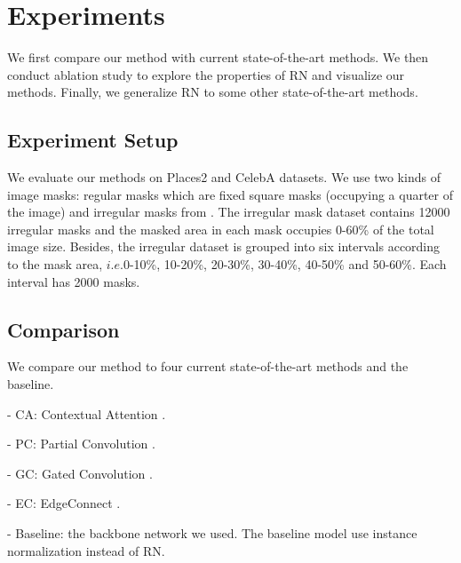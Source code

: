 \documentclass[letterpaper]{article} %
\begin{document}
\section{Experiments}
We first compare our method with current state-of-the-art methods. We then conduct ablation study to explore the properties of RN and visualize our methods. Finally, we generalize RN to some other state-of-the-art methods.


\subsection{Experiment Setup}
We evaluate our methods on Places2 \cite{zhou2017places} and CelebA \cite{liu2015deep} datasets. We use two kinds of image masks: regular masks which are fixed square masks (occupying a quarter of the image) and irregular masks from \cite{liu2018image}. The irregular mask dataset contains 12000 irregular masks and the masked area in each mask occupies 0-60\% of the total image size. Besides, the irregular dataset is grouped into six intervals according to the mask area, $i.e.$0-10\%, 10-20\%, 20-30\%, 30-40\%, 40-50\% and 50-60\%. Each interval has 2000 masks.


\subsection{Comparison}
We compare our method to four current state-of-the-art methods and the baseline.

- CA: Contextual Attention \cite{yu2018generative}.

- PC: Partial Convolution \cite{liu2018image}.

- GC: Gated Convolution \cite{yu2019free}.

- EC: EdgeConnect \cite{nazeri2019edgeconnect}.

- Baseline: the backbone network we used. The baseline model use instance normalization instead of RN.
\end{document}
